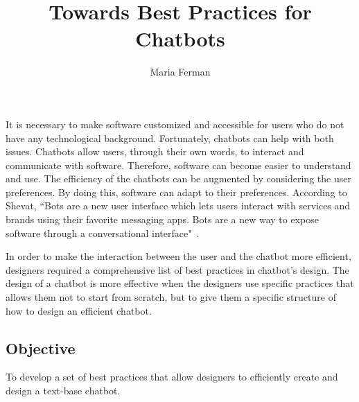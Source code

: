 \documentclass[a4paper,10pt]{article}
\title{Towards Best Practices for Chatbots}
\author{Maria Ferman}
\begin{document}
\maketitle


It is necessary to make software customized and accessible for users who do not have any technological background. Fortunately, chatbots can help with both issues. Chatbots allow users, through their own words, to interact and communicate with software. Therefore, software can become easier to understand and use. The efficiency of the chatbots can be augmented by considering the user preferences. By doing this, software can adapt to their preferences. According to Shevat,  ``Bots are a new user interface which lets users interact with services and brands using their favorite messaging apps. Bots are a new way to expose software through a conversational interface"~\cite{Shevat2017}. 

In order to make the interaction between the user and the chatbot more efficient, designers required a comprehensive list of best practices in chatbot's design. 
The design of a chatbot is more effective when the designers use specific practices that allows them not to start from scratch, but to give them a specific structure of how to design an efficient chatbot. 

\subsection*{Objective}


To develop a set of best practices that allow designers to efficiently create and design a text-base chatbot. 

\end{document}
